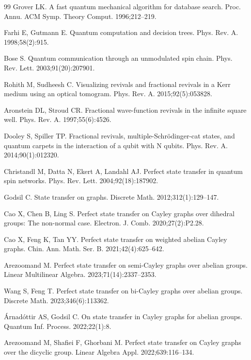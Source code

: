 \documentclass[12pt]{amsart}
\numberwithin{equation}{section}
\theoremstyle{definition}
\theoremstyle{definition} \numberwithin{equation}{section}
\begin{document}
\begin{thebibliography}{99}
Grover LK. A fast quantum mechanical algorithm for database search. Proc. Annu. ACM Symp. Theory Comput. 1996;212--219.

 Farhi E, Gutmann E. Quantum computation and decision trees. Phys. Rev. A. 1998;58(2):915.

 Bose S. Quantum communication through an unmodulated spin chain. Phys. Rev. Lett. 2003;91(20):207901.

 Rohith M, Sudheesh C. Visualizing revivals and fractional revivals in a Kerr medium using an optical tomogram. Phys. Rev. A. 2015;92(5):053828.

 Aronstein DL, Stroud  CR. Fractional wave-function revivals in the infinite square well. Phys. Rev. A. 1997;55(6):4526.

 Dooley S, Spiller TP. Fractional revivals, multiple-Schr{\"o}dinger-cat states, and quantum carpets in the interaction of a qubit with N qubits. Phys. Rev. A. 2014;90(1):012320.

 Christandl M, Datta N, Ekert A, Landahl AJ. Perfect state transfer in quantum spin networks. Phys. Rev. Lett. 2004;92(18):187902.

 Godsil C. State transfer on graphs. Discrete Math. 2012;312(1):129--147.

 Cao X, Chen B, Ling S. Perfect state transfer on Cayley graphs over dihedral groups: The non-normal case. Electron. J. Comb. 2020;27(2):P2.28.

 Cao X, Feng K, Tan YY. Perfect state transfer on weighted abelian Cayley graphs. Chin. Ann. Math. Ser. B. 2021;42(4):625--642.

 Arezoomand M. Perfect state transfer on semi-Cayley graphs over abelian groups. Linear Multilinear Algebra. 2023;71(14):2337--2353.

 Wang S, Feng T.  Perfect state transfer on bi-Cayley graphs over abelian groups. Discrete Math. 2023;346(6):113362.

  {\'A}rnad{\'o}ttir AS, Godsil C. On state transfer in Cayley graphs for abelian groups. Quantum Inf. Process. 2022;22(1):8.

 Arezoomand M, Shafiei F, Ghorbani M. Perfect state transfer on Cayley graphs over the dicyclic group. Linear Algebra Appl. 2022;639:116--134.


\end{thebibliography}
\end{document}
